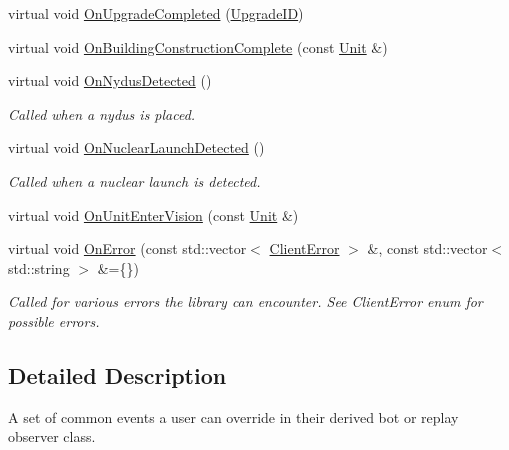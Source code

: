 \begin{DoxyCompactItemize}
\item 
virtual void \hyperlink{classsc2_1_1_client_events_a4cdc022420833b34fbcd1c9713096754}{On\+Upgrade\+Completed} (\hyperlink{classsc2_1_1_s_c2_type}{Upgrade\+ID})
\item 
virtual void \hyperlink{classsc2_1_1_client_events_a635150e0895fb3fed29268f5b53cbd05}{On\+Building\+Construction\+Complete} (const \hyperlink{classsc2_1_1_unit}{Unit} \&)
\item 
\mbox{\label{classsc2_1_1_client_events_afde152c65ab94bdb57e345a8fd1532aa}} 
virtual void \hyperlink{classsc2_1_1_client_events_afde152c65ab94bdb57e345a8fd1532aa}{On\+Nydus\+Detected} ()
\begin{DoxyCompactList}\small\item\em Called when a nydus is placed. \end{DoxyCompactList}\item 
\mbox{\label{classsc2_1_1_client_events_ab9923f256e3bf6e518ccb8ec26f8ae88}} 
virtual void \hyperlink{classsc2_1_1_client_events_ab9923f256e3bf6e518ccb8ec26f8ae88}{On\+Nuclear\+Launch\+Detected} ()
\begin{DoxyCompactList}\small\item\em Called when a nuclear launch is detected. \end{DoxyCompactList}\item 
virtual void \hyperlink{classsc2_1_1_client_events_a835228e18d8b4488b0f8e830a39116ce}{On\+Unit\+Enter\+Vision} (const \hyperlink{classsc2_1_1_unit}{Unit} \&)
\item 
\mbox{\label{classsc2_1_1_client_events_a35424cb2a0baa509f997149521ab2c52}} 
virtual void \hyperlink{classsc2_1_1_client_events_a35424cb2a0baa509f997149521ab2c52}{On\+Error} (const std\+::vector$<$ \hyperlink{sc2__client_8h_ac7d3e3694a208204e099f04c1e5eded0}{Client\+Error} $>$ \&, const std\+::vector$<$ std\+::string $>$ \&=\{\})
\begin{DoxyCompactList}\small\item\em Called for various errors the library can encounter. See Client\+Error enum for possible errors. \end{DoxyCompactList}\end{DoxyCompactItemize}


\subsection{Detailed Description}
A set of common events a user can override in their derived bot or replay observer class. 

